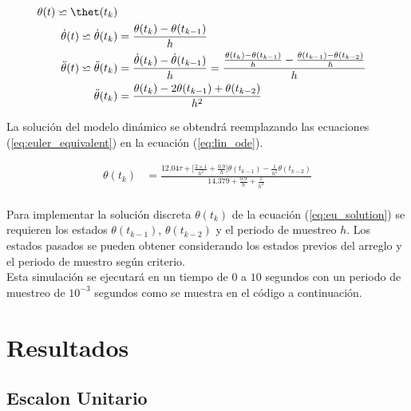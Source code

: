 \documentclass[12pt]{article}
\begin{document}
\begin{equation}
    \begin{split}
        \theta(t)\backsimeq \thet(t_{k})\\
        \dot{\theta}(t)\backsimeq \dot{\theta}(t_{k})&=\frac{\theta(t_{k})-\theta(t_{k-1})}{h}\\
        \ddot{\theta}(t)\backsimeq\ddot{\theta}(t_{k})&=\frac{\dot{\theta}(t_{k})-\dot{\theta}(t_{k-1})}{h}=\frac{\frac{\theta(t_{k})-\theta(t_{k-1})}{h}-\frac{\theta(t_{k-1})-\theta(t_{k-2})}{h}}{h}\\
        \ddot{\theta}(t_{k})&=\frac{\theta(t_{k})-2\theta(t_{k-1})+\theta(t_{k-2})}{h^2}\\
    \end{split}
    \label{eq:euler_equivalent}
\end{equation}

La solución del modelo dinámico se obtendrá reemplazando las ecuaciones (\ref{eq:euler_equivalent}) en la ecuación (\ref{eq:lin_ode}).

\begin{equation}
    \begin{split}
        \theta(t_{k})&=\frac{12.04\tau+\lbrack\frac{2\times1}{h^2}+\frac{0.9}{h}\rbrack\theta(t_{k-1})-\frac{1}{h^2}\theta(t_{k-2})}{14.379+\frac{0.9}{h}+\frac{1}{h^2}}\\
    \end{split}
    \label{eq:eu_solution}
\end{equation}

Para implementar la solución discreta $\theta(t_{k})$ de la ecuación (\ref{eq:eu_solution}) se requieren los estados $\theta(t_{k-1})$,  $\theta(t_{k-2})$ y el periodo de muestreo $h$. Los estados pasados se pueden obtener considerando los estados previos del arreglo y el periodo de muestro según criterio.
\\
Esta simulación se ejecutará en un tiempo de $0$ a $10$ segundos con un periodo de muestreo de $10^{-3}$ segundos como se muestra en el código a continuación.



\section{Resultados}


\subsection{Escalon Unitario}
\end{document}
